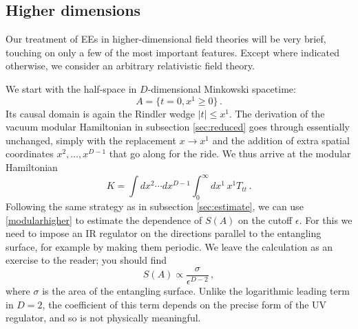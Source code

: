 \documentclass[11pt]{article}
\begin{document}
\subsection{Higher dimensions}
\label{sec:higherdim}

Our treatment of EEs in higher-dimensional field theories will be very brief, touching on only a few of the most important features. Except where indicated otherwise, we consider an arbitrary relativistic field theory.

We start with the half-space in $D$-dimensional Minkowski spacetime:
\begin{equation}\label{half-space}
A = \{t=0,x^1\ge0\}\,.
\end{equation}
Its causal domain is again the Rindler wedge $|t|\le x^1$. The derivation of the vacuum modular Hamiltonian in subsection \ref{sec:reduced} goes through essentially unchanged, simply with the replacement $x\to x^1$ and the addition of extra spatial coordinates $x^2,\ldots,x^{D-1}$ that go along for the ride. We thus arrive at the modular Hamiltonian
\begin{equation}\label{modularhigher}
K = \int dx^2\cdots dx^{D-1}\int_0^\infty dx^1\,x^1T_{tt}\,.
\end{equation}
Following the same strategy as in subsection \ref{sec:estimate}, we can use \eqref{modularhigher} to estimate the dependence of $S(A)$ on the cutoff $\epsilon$. For this we need to impose an IR regulator on the directions parallel to the entangling surface, for example by making them periodic. We leave the calculation as an exercise to the reader; you should find
\begin{equation}\label{area law}
S(A)\propto\frac\sigma{\epsilon^{D-2}}\,,
\end{equation}
where $\sigma$ is the area of the entangling surface. Unlike the logarithmic leading term in $D=2$, the coefficient of this term depends on the precise form of the UV regulator, and so is not physically meaningful.
\end{document}
